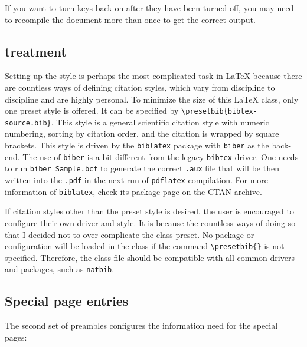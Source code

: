 \documentclass[final]{emory}
\begin{document}
If you want to turn keys back on after they have been turned off, you may need 
to recompile the document more than once to get the correct output.

\subsection{{\BibTeX{}} treatment}
Setting up the \BibTeX{} style is perhaps the most complicated task in \LaTeX{} 
because there are countless ways of defining citation styles, which vary from 
discipline to discipline and are highly personal.
To minimize the size of this \LaTeX{} class, only one preset \BibTeX{} style
is offered. It can be specified by \Verb|\presetbib{bibtex-source.bib}|.
This style is a general scientific citation style with numeric numbering, 
sorting by citation order, and the citation is wrapped by square brackets. 
This style is driven by the \Verb|biblatex| package with \Verb|biber| as the 
back-end. 
The use of \Verb|biber| is a bit different from the legacy \Verb|bibtex| driver.
One needs to run \Verb|biber Sample.bcf| to generate the correct \Verb|.aux| 
file that will be then written into the \Verb|.pdf| in the next run of 
\Verb|pdflatex| compilation. For more information of \Verb|biblatex|, check its 
package page on the CTAN archive. 

If citation styles other than the preset style is desired, the user is 
encouraged to configure their own \BibTeX{} driver and style.
It is because the countless ways of doing so that I decided not to 
over-complicate the class preset.
No \BibTeX{} package or configuration will be loaded in the class if the 
command \Verb|\presetbib{}| is not specified. 
Therefore, the class file should be compatible with all common \BibTeX{} 
drivers and packages, such as \Verb|natbib|. 


\subsection{Special page entries}
The second set of preambles configures the information need for the special pages:
\end{document}
